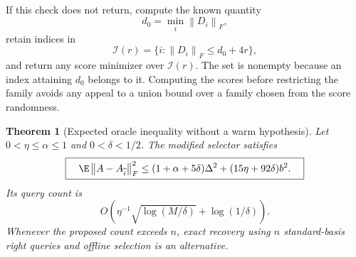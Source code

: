 \documentclass[11pt,oneside,openany,a4paper]{book}
\numberwithin{equation}{chapter}
\newtheorem{theorem}{Theorem}[chapter]
\theoremstyle{definition}
\theoremstyle{remark}
\newcommand{\F}[1]{\left\lVert#1\right\rVert_F}
\begin{document}
If this check does not return, compute the known quantity
\[
 d_0=\min_i\F{D_i},
\]
retain indices in
\begin{equation}\label{expected:eq:filter}
 \mathcal I(r)=\{i:\F{D_i}\le d_0+4r\},
\end{equation}
and return any score minimizer over $\mathcal I(r)$. The set is
nonempty because an index attaining $d_0$ belongs to it. Computing
the scores before restricting the family avoids any appeal to a
union bound over a family chosen from the score randomness.

\begin{theorem}[Expected oracle inequality without a warm hypothesis]
\label{expected:thm:oracle}
Let $0<\eta\le\alpha\le1$ and $0<\delta<1/2$.
The modified selector satisfies
\begin{equation}\label{expected:eq:oracle}
 \boxed{\quad
 \E\F{A-A_{\widehat i}}^2
 \le(1+\alpha+5\delta)\Delta^2
       +(15\eta+92\delta)b^2.
 \quad}
\end{equation}
Its query count is
\[
 O\!\left(\eta^{-1}\sqrt{\log(M/\delta)}+
                   \log(1/\delta)\right).
\]
Whenever the proposed count exceeds $n$, exact recovery using $n$
standard-basis right queries and offline selection is an alternative.
\end{theorem}
\end{document}
